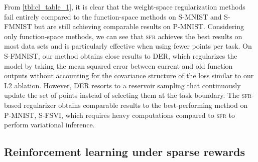 \documentclass{article}
\newcommand{\our}{\textsc{sfr}\xspace}
\begin{document}
From \cref{tbl:cl_table_1}, it is clear that the weight-space regularization methods fail entirely compared to the function-space methods on S-MNIST and S-FMNIST but are still achieving comparable results on P-MNIST.
Considering only function-space methods, we can see that \our achieves the best results on most data sets and is particularly effective when using fewer points per task.
On S-FMNIST, our method obtains close results to DER, which regularizes the model by taking the mean squared error between current and old function outputs without accounting for the covariance structure of the loss similar to our L2 ablation. However, DER resorts to a reservoir sampling \citep{vitter1985random} that continuously update the set of points instead of selecting them at the task boundary.
The \our-based regularizer obtains comparable results to the best-performing method on P-MNIST, S-FSVI, which requires heavy computations compared to \our to perform variational inference.





\subsection{Reinforcement learning under sparse rewards}
\label{sec:rl-exp}



\end{document}
